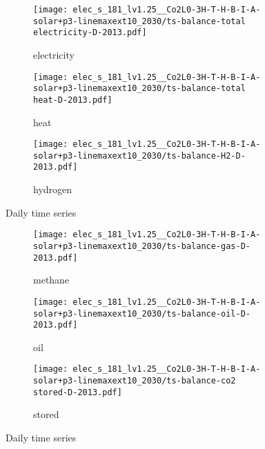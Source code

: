 \begin{figure}
    \centering
    \begin{subfigure}[t]{\textwidth}
        \centering
        \caption{electricity}
        \texttt{[image: elec\_s\_181\_lv1.25\_\_Co2L0-3H-T-H-B-I-A-solar+p3-linemaxext10\_2030/ts-balance-total electricity-D-2013.pdf]}
    \end{subfigure}
    \begin{subfigure}[t]{\textwidth}
        \centering
        \caption{heat}
        \texttt{[image: elec\_s\_181\_lv1.25\_\_Co2L0-3H-T-H-B-I-A-solar+p3-linemaxext10\_2030/ts-balance-total heat-D-2013.pdf]}
    \end{subfigure}
    \begin{subfigure}[t]{\textwidth}
        \centering
        \caption{hydrogen}
        \texttt{[image: elec\_s\_181\_lv1.25\_\_Co2L0-3H-T-H-B-I-A-solar+p3-linemaxext10\_2030/ts-balance-H2-D-2013.pdf]}
    \end{subfigure}
    \caption{Daily time series}
    \label{fig:eligibility}
\end{figure}

\begin{figure}
    \centering
    \begin{subfigure}[t]{\textwidth}
        \centering
        \caption{methane}
        \texttt{[image: elec\_s\_181\_lv1.25\_\_Co2L0-3H-T-H-B-I-A-solar+p3-linemaxext10\_2030/ts-balance-gas-D-2013.pdf]}
    \end{subfigure}
    \begin{subfigure}[t]{\textwidth}
        \centering
        \caption{oil}
        \texttt{[image: elec\_s\_181\_lv1.25\_\_Co2L0-3H-T-H-B-I-A-solar+p3-linemaxext10\_2030/ts-balance-oil-D-2013.pdf]}
    \end{subfigure}
    \begin{subfigure}[t]{\textwidth}
        \centering
        \caption{stored \co}
        \texttt{[image: elec\_s\_181\_lv1.25\_\_Co2L0-3H-T-H-B-I-A-solar+p3-linemaxext10\_2030/ts-balance-co2 stored-D-2013.pdf]}
    \end{subfigure}
    \caption{Daily time series}
    \label{fig:eligibility}
\end{figure}


